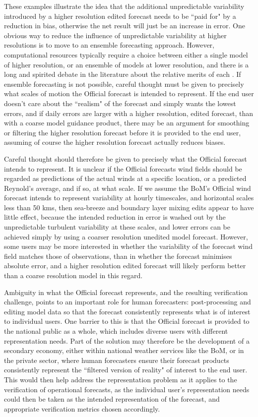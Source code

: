 \documentclass{ametsoc}
\begin{document}
These examples illustrate the idea that the additional unpredictable variability introduced by a higher resolution edited forecast needs to be ``paid for" by a reduction in bias, otherwise the net result will just be an increase in error.  One obvious way to reduce the influence of unpredictable variability at higher resolutions is to move to an ensemble forecasting approach. However, computational resources typically require a choice between either a single model of higher resolution, or an ensemble of models at lower resolution, and there is a long and spirited debate in the literature about the relative merits of each \citep{brooks93}. If ensemble forecasting is not possible, careful thought must be given to precisely what scales of motion the Official forecast is intended to represent. If the end user doesn't care about the ``realism" of the forecast and simply wants the lowest errors, and if daily errors are larger with a higher resolution, edited forecast, than with a coarse model guidance product, there may be an argument for smoothing or filtering the higher resolution forecast before it is provided to the end user, assuming of course the higher resolution forecast actually reduces biases. 

Careful thought should therefore be given to precisely what the Official forecast intends to represent. It is unclear if the Official forecasts wind fields should be regarded as predictions of the actual winds at a specific location, or a predicted Reynold's average, and if so, at what scale. If we assume the BoM's Official wind forecast intends to represent variability at hourly timescales, and horizontal scales less than 50 kms, then sea-breeze and boundary layer mixing edits appear to have little effect, because the intended reduction in error is washed out by the unpredictable turbulent variability at these scales, and lower errors can be achieved simply by using a coarser resolution unedited model forecast. However, some users may be more interested in whether the variability of the forecast wind field matches those of observations, than in whether the forecast minimises absolute error, and a higher resolution edited forecast will likely perform better than a coarse resolution model in this regard. 

Ambiguity in what the Official forecast represents, and the resulting verification challenge, points to an important role for human forecasters: post-processing and editing model data so that the forecast consistently represents what is of interest to individual users. One barrier to this is that the Official forecast is provided to the national public as a whole, which includes diverse users with different representation needs. Part of the solution may therefore be the development of a secondary economy, either within national weather services like the BoM, or in the private sector, where human forecasters ensure their forecast products consistently represent the ``filtered version of reality" of interest to the end user. This would then help address the representation problem as it applies to the verification of operational forecasts, as the individual user's representation needs could then be taken as the intended representation of the forecast, and appropriate verification metrics chosen accordingly.    
\end{document}
